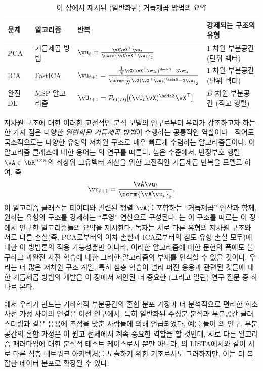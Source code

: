 \documentclass[../../book-main_ko.tex]{subfiles}
\begin{document}
\begin{table}[tb]
\centering
    \caption{이 장에서 제시된 (일반화된) 거듭제곱 방법의 요약}
    \label{tab:power-method-summary}
\begin{tabular}{llll}
\toprule
문제 & 알고리즘 & 반복 & 강제되는 구조의 유형 \\
\midrule
PCA & 거듭제곱 방법 & $\vu_{t} = \frac{\vX\vX^\top
    \vu_{t}}{\norm{\vX\vX^\top \vu_{t}}_2}$ & $1$-차원 부분공간 (단위 벡터) \\
    \addlinespace
    ICA & FastICA &
    $\vu_{t+1} = \frac{\tfrac{1}{N}\vX (\vX^\top \vu_{t})^{\hada 3}-
    3 \vu_{t}}{\norm*{\tfrac{1}{N}\vX (\vX^\top \vu_{t})^{\hada 3}-
    3 \vu_{t}}_2}$
    & $1$-차원 부분공간 (단위 벡터) \\
    \addlinespace
    완전 DL & MSP 알고리즘 &
    $\vU_{t+1} = \mathcal{P}_{\mathrm O(D)}[( {\vU_t \vX})^{\hada 3}\vX^\top]$
    & $D$-차원 부분공간 (직교 행렬) \\
\bottomrule
\end{tabular}
\end{table}

저차원 구조에 대한 이러한 고전적인 분석 모델의 연구로부터 우리가 강조하고자 하는 한 가지 점은 다양한 \textit{일반화된 거듭제곱 방법}이 수행하는 공통적인 역할이다---적어도 국소적으로는 다양한 유형의 저차원 구조로 매우 빠르게 수렴하는 알고리즘들이다. 이 알고리즘 클래스에 대한 용어는 \textcite{JourneeM2010}의 연구를 따른다. 높은 수준에서, 반정부호 행렬 $\vA \in \bR^{n \times n}$의 최상위 고유벡터 계산을 위한 고전적인 거듭제곱 반복을 모델로 하여, 즉
\begin{equation}
    \vu_{t+1} = \frac{\vA \vu_{t}}{\norm{\vA \vu_{t}}_2},
\end{equation}
이 알고리즘 클래스는 데이터와 관련된 행렬 $\vA$를 포함하는 ``거듭제곱'' 연산과 함께, 원하는 유형의 구조를 강제하는 ``투영'' 연산으로 구성된다. 는 이 구조를 따르는 이 장에서 연구한 알고리즘들의 요약을 제시한다. 독자는 서로 다른 유형의 저차원 구조와 서로 다른 손실(즉, PCA로부터의 이차 손실과 ICA로부터의 첨도 유형 손실 모두)에 대한 이 방법론의 적용 가능성뿐만 아니라, 이러한 알고리즘에 대한 문헌의 폭에도 불구하고 과완전 사전 학습에 대한 그러한 알고리즘의 부재를 인식할 수 있을 것이다. 우리는 더 많은 저차원 구조 계열, 특히 심층 학습이 널리 퍼진 응용과 관련된 것들에 대한 거듭제곱 방법의 개발을 이 장에서 제안된 더 중요한 (그리고 열린) 연구 질문 중 하나로 본다.

에서 우리가 만드는 기하학적 부분공간의 혼합 분포 가정과 더 분석적으로 편리한 희소 사전 가정 사이의 연결은 이전 연구에서, 특히 일반화된 주성분 분석과 부분공간 클러스터링과 같은 응용에 초점을 맞춘 사람들에 의해 언급되었다, 예를 들어 \textcite{GPCA}의 연구. 부분공간의 혼합 가정은 이 원고 전체에서 계속 중요한 역할을 할 것인데, 서로 다른 알고리즘 패러다임에 대한 분석적 테스트 케이스로서 뿐만 아니라, 의 LISTA에서와 같이 서로 다른 심층 네트워크 아키텍처를 도출하기 위한 기초로서도 그러하지만, 이는 더 복잡한 데이터 분포로 확장될 수 있다.
\end{document}
